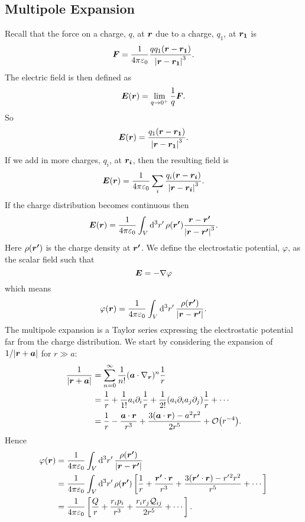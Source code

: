 \documentclass[a4paper]{article}
\begin{document}
    \subsection{Multipole Expansion}
    Recall that the force on a charge, \(q\), at \(\bm{r}\) due to a charge, \(q_1\), at \(\bm{r_1}\) is
    \[\bm{F} = \frac{1}{4\pi\varepsilon_0} \frac{qq_1(\bm{r} - \bm{r_1})}{\abs{\bm{r} - \bm{r_1}}^3}.\]
    The electric field is then defined as
    \[\bm{E}(\bm{r}) = \lim_{q\to 0^+} \frac{1}{q}\bm{F}.\]
    So
    \[\bm{E}(\bm{r}) = \frac{q_1(\bm{r} - \bm{r_1})}{\abs{\bm{r} - \bm{r_1}}^3}.\]
    If we add in more charges, \(q_i\), at \(\bm{r_i}\), then the resulting field is
    \[\bm{E}(\bm{r}) = \frac{1}{4\pi\varepsilon_0} \sum_i \frac{q_i(\bm{r} - \bm{r_i})}{\abs{\bm{r} - \bm{r_i}}^3}.\]
    If the charge distribution becomes continuous then
    \[\bm{E}(\bm{r}) = \frac{1}{4\pi\varepsilon_0} \int_V\dd[3]{r'} \rho(\bm{r'}) \frac{\bm{r} - \bm{r'}}{\abs{\bm{r} - \bm{r'}}^3}.\]
    Here \(\rho(\bm{r'})\) is the charge density at \(\bm{r'}\).
    We define the electrostatic potential, \(\varphi\), as the scalar field such that
    \[\bm{E} = -\nabla\varphi\]
    which means
    \[\varphi(\bm{r}) = \frac{1}{4\pi\varepsilon_0}\int_V \dd[3]{r'} \frac{\rho(\bm{r'})}{\abs{\bm{r} - \bm{r'}}}.\]
    The multipole expansion is a Taylor series expressing the electrostatic potential far from the charge distribution.
    We start by considering the expansion of \(1/\abs{\bm{r} + \bm{a}}\) for \(r \gg a\):
    \begin{align*}
        \frac{1}{\abs{\vv{r} + \vv{a}}} &= \sum_{n=0}^{\infty} \frac{1}{n!} (\vv{a} \cdot \grad_{\vv{r}})^n \frac{1}{r}\\
        &= \frac{1}{r} + \frac{1}{1!}a_i\partial_i\frac{1}{r} + \frac{1}{2!}(a_i\partial_ia_j\partial_j) \frac{1}{r} + \dotsb\\
        &= \frac{1}{r} - \frac{\vv{a}\cdot\vv{r}}{r^3} + \frac{3(\vv{a}\cdot\vv{r}) - a^2r^2}{2r^5} + \order{r^{-4}}.
    \end{align*}
    Hence
    \begin{align*}
        \varphi(\bm{r}) &= \frac{1}{4\pi\varepsilon_0} \int_V \dd[3]{r'} \frac{\rho(\bm{r'})}{\abs{\bm{r} - \bm{r'}}}\\
        &= \frac{1}{4\pi\varepsilon_0} \int_V \dd[3]{r'} \rho(\bm{r'})\left[ \frac{1}{r} + \frac{\bm{r'}\cdot\bm{r}}{r^3} + \frac{3(\bm{r'}\cdot\bm{r}) - r'{^2}r^2}{r^5} + \dotsb \right]\\
        &= \frac{1}{4\pi\varepsilon_0} \left[\frac{Q}{r} + \frac{r_ip_i}{r^3} + \frac{r_ir_j\mathcal{Q}_{ij}}{2r^5} + \dotsb\right].
    \end{align*}
\end{document}
